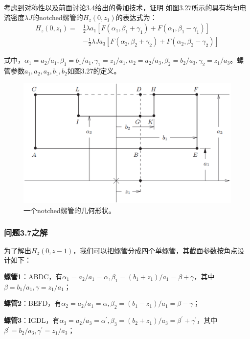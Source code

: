 考虑到对称性以及前面讨论3.4给出的叠加技术，证明
如图3.27所示的具有均匀电流密度$\lambda J$的notched螺管的$H_z(0, z_1)$的表达式为：
\begin{equation}%
\begin{split}
H_z(0,z_1)=&\frac{1}{2}\lambda a_1\left[F(\alpha_1,\beta_1+\gamma_1)+F(\alpha_1,\beta_1-\gamma_1)\right]\\
&-\frac{1}{2}\lambda Ja_3
\left[F(\alpha_2,\beta_2+\gamma_2)+F(\alpha_2,\beta_2-\gamma_2)\right]
\end{split}
\end{equation}

式中，$\alpha_1=a_2/a_1,\beta_1=b_1/a_1,\gamma_1=z_1/a_1,\alpha_2=a_2/a_3,\beta_2=b_2/a_3,\gamma_2=z_1/a_3$。螺管参数$a_1, a_2, a_3, b_1, b_2$如图3.27的定义。
\begin{figure}[htbp]
	\centering
	\includegraphics[scale=0.4]{chpt3/figs/fig3.27.eps}
	\caption{一个notched螺管的几何形状。}
\end{figure}


\subsubsection{问题3.7之解}
为了解出$H_z(0,z-1)$，我们可以把螺管分成四个单螺管，其截面参数按角点设计如下：

\textbf{螺管1}：ABDC，有$\alpha_1=a_2/a_1=\alpha,\beta_1=(b_1+z_1)/a_1=\beta+\gamma$，其中
$\beta=b_1/a_1,\gamma=z_1/a_1$；

\textbf{螺管2}：BEFD，有$\alpha_2=a_2/a_1=\alpha,\beta_2=(b_1-z_1)/a_1=\beta-\gamma$；

\textbf{螺管3}：IGDL，有$\alpha_3=a_2/a_3=\alpha^\prime,\beta_3=(b_2+z_1)/a_3=\beta^\prime+\gamma^\prime$，其中$\beta^\prime=b_2/a_3,\gamma^\prime=z_1/a_3$；

